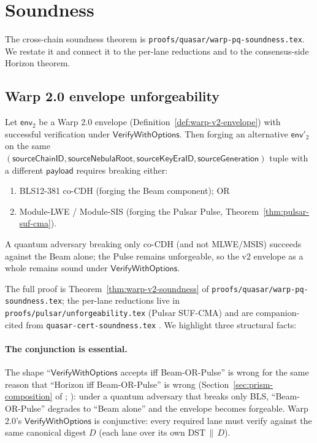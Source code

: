 \section{Soundness}
\label{sec:soundness}

The cross-chain soundness theorem is \texttt{proofs/quasar/warp-pq-soundness.tex}. We restate it and connect it to the per-lane reductions and to the consensus-side Horizon theorem.

\subsection{Warp 2.0 envelope unforgeability}

\begin{theorem}
\label{thm:warp-v2-soundness}
Let $\mathsf{env}_2$ be a Warp 2.0 envelope (Definition~\ref{def:warp-v2-envelope}) with successful verification under $\mathsf{VerifyWithOptions}$. Then forging an alternative $\mathsf{env}'_2$ on the same $(\mathsf{sourceChainID}, \mathsf{sourceNebulaRoot}, \mathsf{sourceKeyEraID}, \mathsf{sourceGeneration})$ tuple with a different $\mathsf{payload}$ requires breaking either:
\begin{enumerate}[leftmargin=2em,nosep]
  \item BLS12-381 co-CDH (forging the Beam component); OR
  \item Module-LWE / Module-SIS (forging the Pulsar Pulse, Theorem~\ref{thm:pulsar-suf-cma}).
\end{enumerate}
A quantum adversary breaking only co-CDH (and not MLWE/MSIS) succeeds against the Beam alone; the Pulse remains unforgeable, so the v2 envelope as a whole remains sound under $\mathsf{VerifyWithOptions}$.
\end{theorem}

The full proof is Theorem~\ref{thm:warp-v2-soundness} of \texttt{proofs/quasar/warp-pq-soundness.tex}; the per-lane reductions live in \texttt{proofs/pulsar/unforgeability.tex} (Pulsar SUF-CMA) and are companion-cited from \texttt{quasar-cert-soundness.tex} \cite{quasarcertsoundness}. We highlight three structural facts:

\paragraph{The conjunction is essential.} The shape ``$\mathsf{VerifyWithOptions}$ accepts iff Beam-OR-Pulse'' is wrong for the same reason that ``Horizon iff Beam-OR-Pulse'' is wrong (Section~\ref{sec:prism-composition} of \cite{luxquasarhorizon}; \cite{pqfinalitynobls}): under a quantum adversary that breaks only BLS, ``Beam-OR-Pulse'' degrades to ``Beam alone'' and the envelope becomes forgeable. Warp 2.0's $\mathsf{VerifyWithOptions}$ is conjunctive: every required lane must verify against the same canonical digest $D$ (each lane over its own DST$\,\|\,D$).

